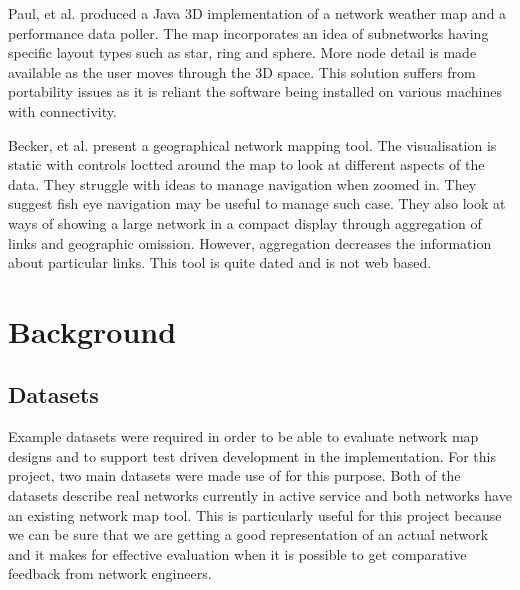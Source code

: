 \documentclass{article}
\begin{document}
Paul, et al. produced a Java 3D implementation of a network weather map and a
performance data poller.\cite{Paul_2000} The map incorporates an idea of
subnetworks having specific layout types such as star, ring and sphere. More
node detail is made available as the user moves through the 3D space. This
solution suffers from portability issues as it is reliant the software being
installed on various machines with connectivity.

Becker, et al. present a geographical network mapping tool.\cite{Becker_1995}
The visualisation is static with controls loctted around the map to look at
different aspects of the data. They struggle with ideas to manage navigation
when zoomed in. They suggest fish eye navigation may be useful to manage such
case. They also look at ways of showing a large network in a compact display
through aggregation of links and geographic omission. However, aggregation
decreases the information about particular links. This tool is quite dated and
is not web based.



\section{Background}
\label{sec:background}

\subsection{Datasets}
\label{sec:datasets}

Example datasets were required in order to be able to evaluate network map
designs and to support test driven development in the implementation. For this
project, two main datasets were made use of for this purpose. Both of the
datasets describe real networks currently in active service and both networks
have an existing network map tool. This is particularly useful for this project
because we can be sure that we are getting a good representation of an actual
network and it makes for effective evaluation when it is possible to get
comparative feedback from network engineers. 
\end{document}
